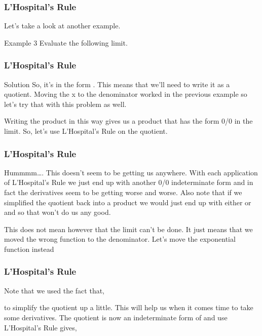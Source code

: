 \documentclass{beamer}
\begin{document}
\begin{frame}
	\frametitle{L’Hospital’s Rule}
	\large
Let’s take a look at another example.
 
Example 3  Evaluate the following limit.
          
        \end{frame}
        \begin{frame}
        	\frametitle{L’Hospital’s Rule}
        	\large                                                        
Solution
So, it’s in the form .  This means that we’ll need to write it as a quotient.  Moving the x to the denominator worked in the previous example so let’s try that with this problem as well.
                                                          
Writing the product in this way gives us a product that has the form 0/0 in the limit.  So, let’s use L’Hospital’s Rule on the quotient.
                       
 \end{frame}
 \begin{frame}
 	\frametitle{L’Hospital’s Rule}
 	\large
 
Hummmm….  This doesn’t seem to be getting us anywhere.  With each application of L’Hospital’s Rule we just end up with another 0/0 indeterminate form and in fact the derivatives seem to be getting worse and worse.  Also note that if we simplified the quotient back into a product we would just end up with either  or  and so that won’t do us any good.
 
This does not mean however that the limit can’t be done.  It just means that we moved the wrong function to the denominator.  Let’s move the exponential function instead\end{frame}
\begin{frame}
	\frametitle{L’Hospital’s Rule}
	\large                                      
Note that we used the fact that,
                                                                  
to simplify the quotient up a little.  This will help us when it comes time to take some derivatives.  The quotient is now an indeterminate form of  and use L’Hospital’s Rule gives,
                                             
\end{frame}
\end{document}

